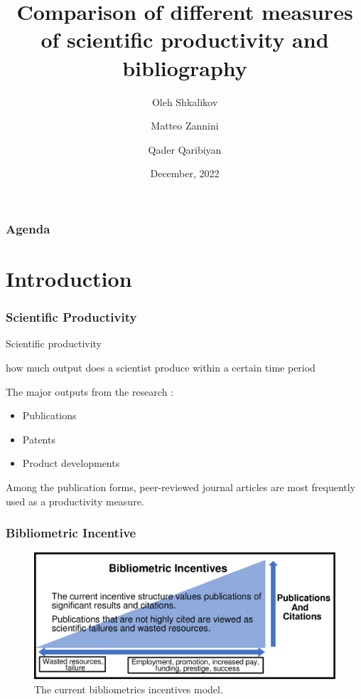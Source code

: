 \documentclass{beamer}
\title[Scientific metrics]{Comparison of different measures of scientific productivity and bibliography}
\author[O. Shkalikov \and M. Zannini \and Q.Qaribiyan]
{Oleh Shkalikov \and Matteo Zannini \and Qader Qaribiyan}
\institute[]{TU Dresden, Computer Science Faculty}
\date{December, 2022}
\begin{document}
\frame{\titlepage}

\begin{frame}
    \frametitle{Agenda}
    \tableofcontents
\end{frame}

\section{Introduction}

\begin{frame}

    \frametitle{Scientific Productivity}

    Scientific productivity

   \hspace{1cm}

    how much output does a scientist produce within a certain time period

   \hspace{1cm}

   The major outputs from the research :

   \hspace{1cm}
    \begin{itemize}
      \item  Publications
      \item Patents
      \item  Product developments
    \end{itemize}
Among the publication forms, peer-reviewed journal articles are most frequently used as a productivity measure.
\end{frame}

\begin{frame}

    \frametitle{Bibliometric Incentive}

    \begin{figure}[h]
        \includegraphics[height=0.5\textheight]{1.png}
        \caption{The current bibliometrics incentives model.}
    \end{figure}

\end{frame}
\end{document}
